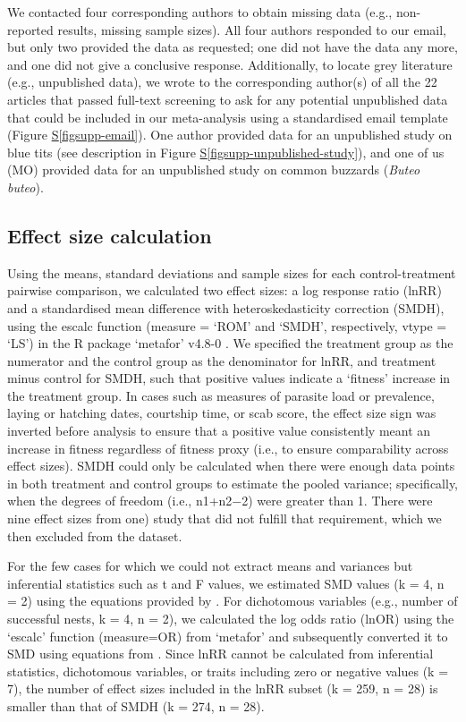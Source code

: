 \documentclass[
  number,
  review,
  onecolumn]{elsarticle}
\newcommand*\quartofigsuppref[1]{Figure \hyperref[#1]{S\ref{#1}}}
\begin{document}
We contacted four corresponding authors to obtain missing data (e.g.,
non-reported results, missing sample sizes). All four authors responded
to our email, but only two provided the data as requested; one did not
have the data any more, and one did not give a conclusive response.
Additionally, to locate grey literature (e.g., unpublished data), we
wrote to the corresponding author(s) of all the 22 articles that passed
full-text screening to ask for any potential unpublished data that could
be included in our meta-analysis using a standardised email template
(\quartofigsuppref{figsupp-email}). One author provided data for an
unpublished study on blue tits (see description in
\quartofigsuppref{figsupp-unpublished-study}), and one of us (MO)
provided data for an unpublished study on common buzzards (\emph{Buteo
buteo}).

\subsection{Effect size calculation}\label{effect-size-calculation}

Using the means, standard deviations and sample sizes for each
control-treatment pairwise comparison, we calculated two effect sizes: a
log response ratio (lnRR) and a standardised mean difference with
heteroskedasticity correction (SMDH), using the escalc function (measure
= `ROM' and `SMDH', respectively, vtype = `LS') in the R package
`metafor' v4.8-0 \citep{metafor}. We specified the treatment group as
the numerator and the control group as the denominator for lnRR, and
treatment minus control for SMDH, such that positive values indicate a
`fitness' increase in the treatment group. In cases such as measures of
parasite load or prevalence, laying or hatching dates, courtship time,
or scab score, the effect size sign was inverted before analysis to
ensure that a positive value consistently meant an increase in fitness
regardless of fitness proxy (i.e., to ensure comparability across effect
sizes). SMDH could only be calculated when there were enough data points
in both treatment and control groups to estimate the pooled variance;
specifically, when the degrees of freedom (i.e., n1+n2−2) were greater
than 1. There were nine effect sizes from one) study that did not
fulfill that requirement, which we then excluded from the dataset.

For the few cases for which we could not extract means and variances but
inferential statistics such as t and F values, we estimated SMD values
(k = 4, n = 2) using the equations provided by \citep{thehand2019}. For
dichotomous variables (e.g., number of successful nests, k = 4, n = 2),
we calculated the log odds ratio (lnOR) using the `escalc' function
(measure=OR) from `metafor' and subsequently converted it to SMD using
equations from \citep{thehand2019}. Since lnRR cannot be calculated from
inferential statistics, dichotomous variables, or traits including zero
or negative values (k = 7), the number of effect sizes included in the
lnRR subset (k = 259, n = 28) is smaller than that of SMDH (k = 274, n =
28).
\end{document}
